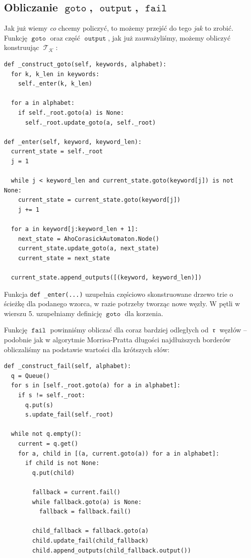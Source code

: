 \documentclass{article}
\DeclareMathOperator{\rot}{\mathfrak{r}}
\DeclareMathOperator{\K}{\mathcal{K}}
\DeclareMathOperator{\trie}{\mathcal{T}}
\DeclareMathOperator{\goto}{\texttt{goto}}
\DeclareMathOperator{\fail}{\texttt{fail}}
\DeclareMathOperator{\out}{\texttt{output}}
\begin{document}
\subsection{Obliczanie $\goto$, $\out$, $\fail$}
Jak już wiemy \textit{co} chcemy policzyć, to możemy przejść do tego \textit{jak} to zrobić. Funkcję $\goto$ oraz część $\out$, jak już zauważyliśmy, możemy obliczyć konstruując $\trie_{\K}$:
\begin{verbatim}
def _construct_goto(self, keywords, alphabet):
  for k, k_len in keywords:
    self._enter(k, k_len)

  for a in alphabet:
    if self._root.goto(a) is None:
      self._root.update_goto(a, self._root)

def _enter(self, keyword, keyword_len):
  current_state = self._root
  j = 1

  while j < keyword_len and current_state.goto(keyword[j]) is not None:
    current_state = current_state.goto(keyword[j])
    j += 1

  for a in keyword[j:keyword_len + 1]:
    next_state = AhoCorasickAutomaton.Node()
    current_state.update_goto(a, next_state)
    current_state = next_state

  current_state.append_outputs([(keyword, keyword_len)])
\end{verbatim}

Funkcja \texttt{def _enter(...)} uzupełnia częściowo skonstruowane drzewo trie o ścieżkę dla podanego wzorca, w razie potrzeby tworząc nowe węzły. W pętli w wierszu 5. uzupełniamy definicję $\goto$ dla korzenia.

\vspace{10pt}

Funkcję $\fail$ powinniśmy obliczać dla coraz bardziej odległych od $\rot$ węzłów -- podobnie jak w algorytmie Morrisa-Pratta długości najdłuższych borderów obliczaliśmy na podstawie wartości dla krótszych słów:

\begin{verbatim}
def _construct_fail(self, alphabet):
  q = Queue()
  for s in [self._root.goto(a) for a in alphabet]:
    if s != self._root:
      q.put(s)
      s.update_fail(self._root)

  while not q.empty():
    current = q.get()
    for a, child in [(a, current.goto(a)) for a in alphabet]:
      if child is not None:
        q.put(child)

        fallback = current.fail()
        while fallback.goto(a) is None:
          fallback = fallback.fail()

        child_fallback = fallback.goto(a)
        child.update_fail(child_fallback)
        child.append_outputs(child_fallback.output())
\end{verbatim}
\end{document}
